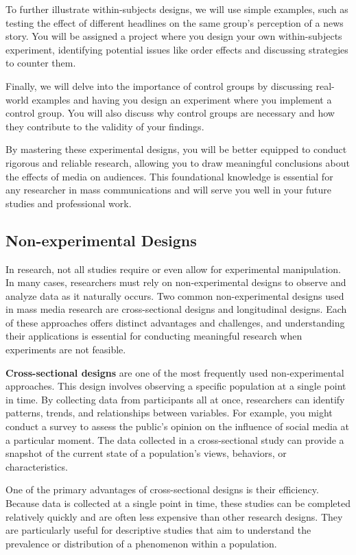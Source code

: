 \documentclass[
]{book}
\begin{document}
To further illustrate within-subjects designs, we will use simple examples, such as testing the effect of different headlines on the same group's perception of a news story. You will be assigned a project where you design your own within-subjects experiment, identifying potential issues like order effects and discussing strategies to counter them.

Finally, we will delve into the importance of control groups by discussing real-world examples and having you design an experiment where you implement a control group. You will also discuss why control groups are necessary and how they contribute to the validity of your findings.

By mastering these experimental designs, you will be better equipped to conduct rigorous and reliable research, allowing you to draw meaningful conclusions about the effects of media on audiences. This foundational knowledge is essential for any researcher in mass communications and will serve you well in your future studies and professional work.

\subsection{Non-experimental Designs}\label{non-experimental-designs}

In research, not all studies require or even allow for experimental manipulation. In many cases, researchers must rely on non-experimental designs to observe and analyze data as it naturally occurs. Two common non-experimental designs used in mass media research are cross-sectional designs and longitudinal designs. Each of these approaches offers distinct advantages and challenges, and understanding their applications is essential for conducting meaningful research when experiments are not feasible.

\textbf{Cross-sectional designs} are one of the most frequently used non-experimental approaches. This design involves observing a specific population at a single point in time. By collecting data from participants all at once, researchers can identify patterns, trends, and relationships between variables. For example, you might conduct a survey to assess the public's opinion on the influence of social media at a particular moment. The data collected in a cross-sectional study can provide a snapshot of the current state of a population's views, behaviors, or characteristics.

One of the primary advantages of cross-sectional designs is their efficiency. Because data is collected at a single point in time, these studies can be completed relatively quickly and are often less expensive than other research designs. They are particularly useful for descriptive studies that aim to understand the prevalence or distribution of a phenomenon within a population.
\end{document}
